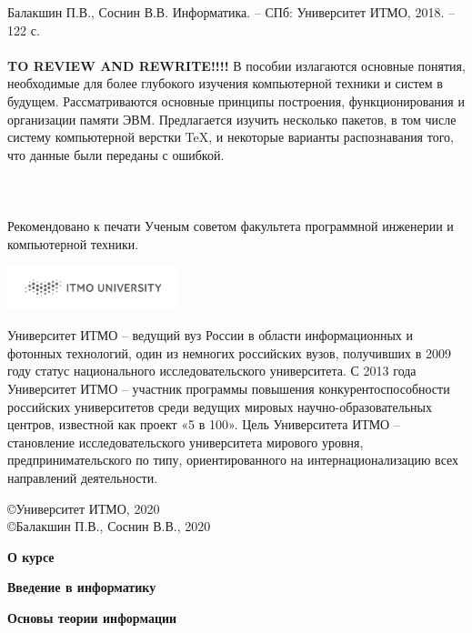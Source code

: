 \documentclass[a5paper,14pt]{report}
\begin{document}
\begin{titlepage}
Балакшин П.В., Соснин В.В.  Информатика. – СПб: Университет ИТМО, 2018. – 122 с.
\\\\\textbf{TO REVIEW AND REWRITE!!!!} В пособии излагаются основные понятия, необходимые для более глубокого изучения компьютерной техники и систем в будущем. Рассматриваются основные принципы построения, функционирования и организации памяти ЭВМ. Предлагается изучить несколько пакетов, в том числе систему компьютерной верстки TeX, и некоторые варианты распознавания того, что данные были переданы с ошибкой.
\\\\\\\\Рекомендовано к печати Ученым советом факультета программной инженерии и компьютерной техники. 
\vspace{5 cm}
\begin{flushright}
\includegraphics[width=5cm]{ITMO_log}
\end{flushright}
Университет ИТМО – ведущий вуз России в области информационных и фотонных технологий, один из немногих российских вузов, получивших в 2009 году статус национального исследовательского университета. С 2013 года Университет ИТМО – участник программы повышения конкурентоспособности российских университетов среди ведущих мировых научно-образовательных центров, известной как проект «5 в 100». Цель Университета ИТМО – становление исследовательского университета мирового уровня, предпринимательского по типу, ориентированного на интернационализацию всех направлений деятельности. 
\begin{flushright}
\copyright Университет ИТМО, 2020
\\\copyright Балакшин П.В., Соснин В.В., 2020
\end{flushright}
\end{titlepage}

\tableofcontents
\newpage
\textbf{О курсе\\}


\newpage
\textbf{Введение в информатику\\}


\newpage
\textbf{Основы теории информации\\}

\end{document}
